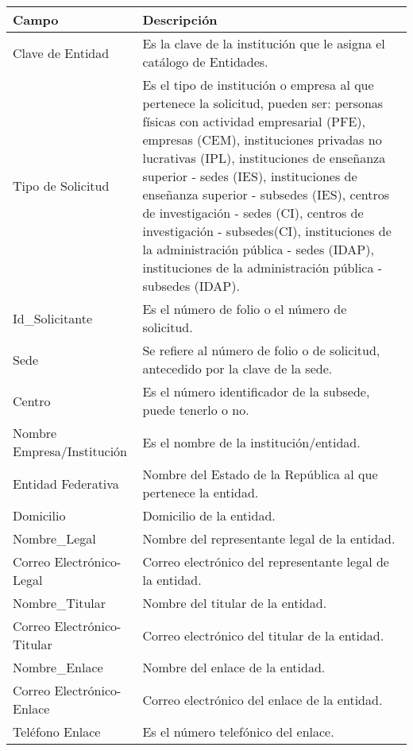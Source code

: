 \begin{tabular}{ m{} m{}  }%
	\rowcolor{gray1} {\bf Campo} &  {\bf Descripción} \\ \hline \hline

	Clave de Entidad & Es la clave de la institución que le asigna el catálogo de Entidades.\\
	\rowcolor{gray1}Tipo de Solicitud & Es el tipo de institución o empresa al que pertenece la solicitud, pueden ser: personas físicas con actividad empresarial (PFE), empresas (CEM), instituciones privadas no lucrativas (IPL), instituciones de enseñanza superior - sedes (IES), instituciones de enseñanza superior - subsedes (IES), centros de investigación - sedes (CI), centros de investigación - subsedes(CI), instituciones de la administración pública - sedes (IDAP), instituciones de la administración pública - subsedes (IDAP).\\
	Id\_Solicitante & Es el número de folio o el número de solicitud.\\
	\rowcolor{gray1}Sede & Se refiere al número de folio o de solicitud, antecedido por la clave de la sede.\\
	Centro & Es el número identificador de la subsede, puede tenerlo o no.\\
	\rowcolor{gray1}Nombre Empresa/Institución & Es el nombre de la institución/entidad.\\
	Entidad Federativa & Nombre del Estado de la República al que pertenece la entidad.\\
	\rowcolor{gray1}Domicilio & Domicilio de la entidad.\\
	Nombre\_Legal & Nombre del representante legal de la entidad.\\
	\rowcolor{gray1}Correo Electrónico-Legal & Correo electrónico del representante legal de la entidad.\\
	Nombre\_Titular & Nombre del titular de la entidad.\\
	\rowcolor{gray1}Correo Electrónico-Titular & Correo electrónico del titular de la entidad.\\
	Nombre\_Enlace & Nombre del enlace de la entidad.\\
	\rowcolor{gray1}Correo Electrónico-Enlace & Correo electrónico del enlace de la entidad.\\
	Teléfono Enlace & Es el número telefónico del enlace.\\
\end{tabular}

\newpage

